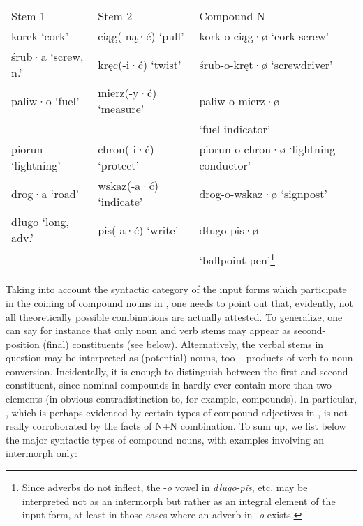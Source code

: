 \documentclass[output=paper]{LSP/langsci}
\begin{document}
\ea \label{ex:szymanek:5}
\begin{tabularx}{\linewidth}[t]{QQQ}
Stem 1   &   Stem 2    &  Compound N\\
korek ‘cork’ &   ciąg(-ną·ć) ‘pull’ & kork-o-ciąg·ø ‘cork-screw’\\
śrub·a ‘screw, n.’ & kręc(-i·ć) ‘twist’ & śrub-o-kręt·ø ‘screwdriver’\\
paliw·o ‘fuel’  &  mierz(-y·ć) ‘measure’&  paliw-o-mierz·ø \\
&&‘fuel indicator’\\
piorun ‘lightning’ & chron(-i·ć) ‘protect’ & piorun-o-chron·ø ‘lightning conductor’\\
drog·a ‘road’  &  wskaz(-a·ć) ‘indicate’ & drog-o-wskaz·ø ‘signpost’\\
długo ‘long, adv.’  &pis(-a·ć) ‘write’  &  długo-pis·ø \\
&&‘ballpoint pen’\footnote{{Since adverbs do not inflect, the -}{\textit{o}} {vowel in} {\textit{długo-pis}}{, etc. may be interpreted not as an intermorph but rather as an integral element of the input form, at least in those cases where an adverb in -}{\textit{o}} {exists.}}\\
\end{tabularx}
\z 


Taking into account the syntactic category of the input forms which participate in the coining of compound nouns in , one needs to point out that, evidently, not all theoretically possible combinations are actually attested. To generalize, one can say for instance that only noun and verb stems may appear as second-position (final) constituents (see below). Alternatively, the verbal stems in question may be interpreted as (potential) nouns, too – products of verb-to-noun conversion. Incidentally, it is enough to distinguish between the first and second constituent, since nominal compounds in  hardly ever contain more than two elements (in obvious contradistinction to, for example,  compounds). In particular, , which is perhaps evidenced by certain types of compound adjectives in , is not really corroborated by the facts of N+N combination. To sum up, we list below the major syntactic types of compound nouns, with examples involving an intermorph only:
\end{document}
